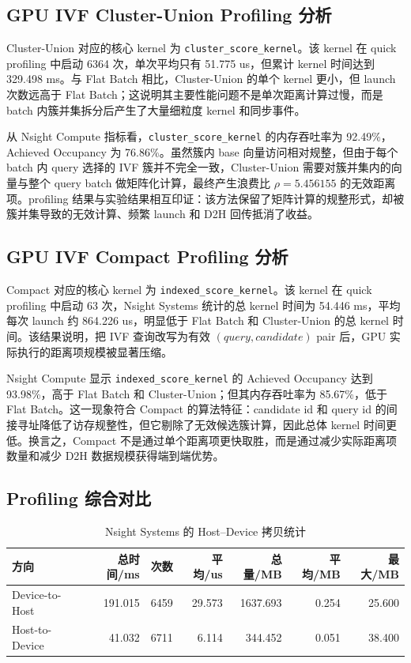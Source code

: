 \documentclass[a4paper]{article}
\begin{document}
\subsection{GPU IVF Cluster-Union Profiling 分析}

Cluster-Union 对应的核心 kernel 为 \texttt{cluster\_score\_kernel}。该 kernel 在 quick profiling 中启动 6364 次，单次平均只有 51.775 us，但累计 kernel 时间达到 329.498 ms。与 Flat Batch 相比，Cluster-Union 的单个 kernel 更小，但 launch 次数远高于 Flat Batch；这说明其主要性能问题不是单次距离计算过慢，而是 batch 内簇并集拆分后产生了大量细粒度 kernel 和同步事件。

从 Nsight Compute 指标看，\texttt{cluster\_score\_kernel} 的内存吞吐率为 92.49\%，Achieved Occupancy 为 76.86\%。虽然簇内 base 向量访问相对规整，但由于每个 batch 内 query 选择的 IVF 簇并不完全一致，Cluster-Union 需要对簇并集内的向量与整个 query batch 做矩阵化计算，最终产生浪费比 $\rho=5.456155$ 的无效距离项。profiling 结果与实验结果相互印证：该方法保留了矩阵计算的规整形式，却被簇并集导致的无效计算、频繁 launch 和 D2H 回传抵消了收益。

\subsection{GPU IVF Compact Profiling 分析}

Compact 对应的核心 kernel 为 \texttt{indexed\_score\_kernel}。该 kernel 在 quick profiling 中启动 63 次，Nsight Systems 统计的总 kernel 时间为 54.446 ms，平均每次 launch 约 864.226 us，明显低于 Flat Batch 和 Cluster-Union 的总 kernel 时间。该结果说明，把 IVF 查询改写为有效 $(query,candidate)$ pair 后，GPU 实际执行的距离项规模被显著压缩。

Nsight Compute 显示 \texttt{indexed\_score\_kernel} 的 Achieved Occupancy 达到 93.98\%，高于 Flat Batch 和 Cluster-Union；但其内存吞吐率为 85.67\%，低于 Flat Batch。这一现象符合 Compact 的算法特征：candidate id 和 query id 的间接寻址降低了访存规整性，但它剔除了无效候选簇计算，因此总体 kernel 时间更低。换言之，Compact 不是通过单个距离项更快取胜，而是通过减少实际距离项数量和减少 D2H 数据规模获得端到端优势。

\subsection{Profiling 综合对比}

\begin{table}[H]
\centering
\small
\caption{Nsight Systems 的 Host--Device 拷贝统计}
\label{tab:profiling-memcpy}
\begin{tabular}{lrrrrrr}
\toprule
方向 & 总时间/ms & 次数 & 平均/us & 总量/MB & 平均/MB & 最大/MB \\
\midrule
Device-to-Host & 191.015 & 6459 & 29.573 & 1637.693 & 0.254 & 25.600 \\
Host-to-Device & 41.032 & 6711 & 6.114 & 344.452 & 0.051 & 38.400 \\
\bottomrule
\end{tabular}
\end{table}
\end{document}
